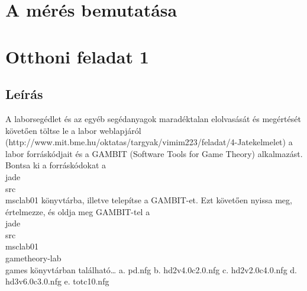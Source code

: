 
\section{A mérés bemutatása}


\section{Otthoni feladat 1}
\subsection{Leírás}
A laborsegédlet és az egyéb segédanyagok maradéktalan elolvasását és megértését követően töltse le a labor weblapjáról (http://www.mit.bme.hu/oktatas/targyak/vimim223/feladat/4-Jatekelmelet) a labor forráskódjait és a GAMBIT (Software Tools for Game Theory) alkalmazást. Bontsa ki a forráskódokat a \\jade\\src\\msclab01 könyvtárba, illetve telepítse a GAMBIT-et. Ezt követően nyissa meg, értelmezze, és oldja meg GAMBIT-tel a \\jade\\src\\msclab01\\gametheory-lab\\games könyvtárban található… 
a. pd.nfg
b. hd2v4.0c2.0.nfg
c. hd2v2.0c4.0.nfg
d. hd3v6.0c3.0.nfg
e. totc10.nfg


